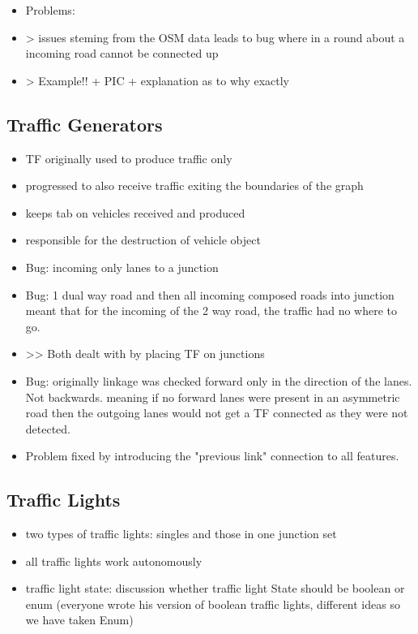 \begin{itemize}
	\item Problems:
	\item > issues steming from the OSM data leads to bug where in a round about a incoming road cannot be connected up
	\item > Example!! + PIC + explanation as to why exactly
\end{itemize}

\subsection{Traffic Generators}
\begin{itemize}
	\item TF originally used to produce traffic only
	\item progressed to also receive traffic exiting the boundaries of the graph
	\item keeps tab on vehicles received and produced
	\item responsible for the destruction of vehicle object
	\item Bug: incoming only lanes to a junction
	\item Bug: 1 dual way road and then all incoming composed roads into junction meant that for the incoming of the 2 way road, the traffic had no where to go.
	\item >> Both dealt with by placing TF on junctions
	\item Bug: originally linkage was checked forward only in the direction of the lanes. Not backwards. meaning if no forward lanes were present in an asymmetric road then the outgoing lanes would not get a TF connected as they were not detected.
	\item Problem fixed by introducing the "previous link" connection to all features.
\end{itemize}


\subsection{Traffic Lights}
\begin{itemize}
    \item two types of traffic lights: singles and those in one junction set
    \item all traffic lights work autonomously
	\item traffic light state: discussion whether traffic light State should be boolean or enum (everyone wrote his version of boolean traffic lights, different ideas so we have taken Enum)
\end{itemize}

